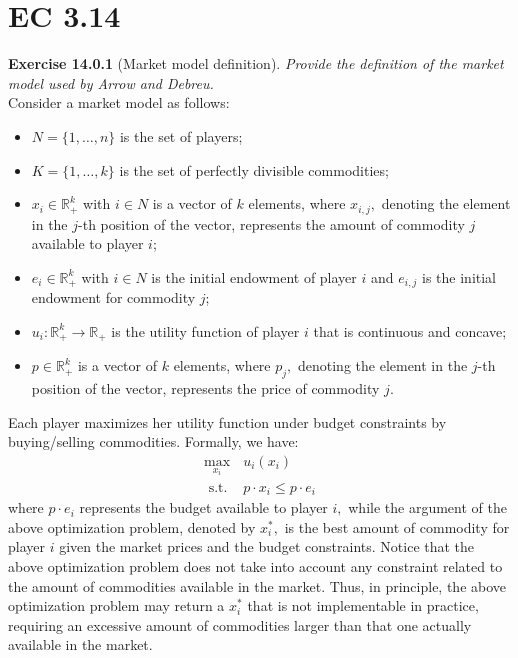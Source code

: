 \section{EC 3.14}
\textbf{Exercise 14.0.1} (Market model definition). \textit{Provide the definition of the market model used by Arrow and Debreu.}\\

Consider a market model as follows:
\begin{itemize}
\item $N=\{1, \ldots, n\}$ is the set of players;
\item $K=\{1, \ldots, k\}$ is the set of perfectly divisible commodities;
\item $x_{i} \in \mathbb{R}_{+}^{k}$ with $i \in N$ is a vector of $k$ elements, where $x_{i, j},$ denoting the element in the $j$-th position of the vector, represents the amount of commodity $j$ available to player $i$;
\item $e_{i} \in \mathbb{R}_{+}^{k}$ with $i \in N$ is the initial endowment of player $i$ and $e_{i, j}$ is the initial endowment for commodity $j$;
\item $u_{i}: \mathbb{R}_{+}^{k} \rightarrow \mathbb{R}_{+}$ is the utility function of player $i$ that is continuous and concave;
\item $p \in \mathbb{R}_{+}^{k}$ is a vector of $k$ elements, where $p_{j},$ denoting the element in the $j$-th position of the vector, represents the price of commodity $j$.
\end{itemize}
Each player maximizes her utility function under budget constraints by buying/selling commodities. Formally, we have:
\[
\begin{array}{cl}
\max _{x_{i}} & u_{i}\left(x_{i}\right) \\
\text { s.t. } & p \cdot x_{i} \leqslant p \cdot e_{i}
\end{array}
\]
where $p \cdot e_{i}$ represents the budget available to player $i,$ while the argument of the above optimization problem, denoted by $x_{i}^{*},$ is the best amount of commodity for player $i$ given the market prices and the budget constraints. Notice that the above optimization problem does not take into account any constraint related to the amount of commodities available in the market. Thus, in principle, the above optimization problem may return a $x_{i}^{*}$ that is not implementable in practice, requiring an excessive amount of commodities larger than that one actually available in the market.\\

